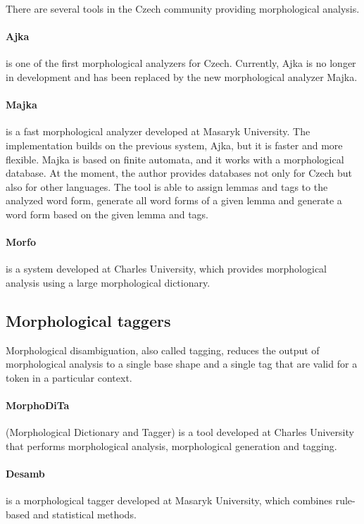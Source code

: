 There are several tools in the Czech community providing morphological analysis.

\paragraph{Ajka}

is one of the first morphological analyzers for Czech. Currently, Ajka is no longer in development and has been replaced by the new morphological analyzer Majka. \cite{Sedlacekthesis}

\paragraph{Majka}

is a fast morphological analyzer developed at Masaryk University. The implementation builds on the previous system, Ajka, but it is faster and more flexible. Majka is based on finite automata, and it works with a morphological database. At the moment, the author provides databases not only for Czech but also for other languages. The tool is able to assign lemmas and tags to the analyzed word form, generate all word forms of a given lemma and generate a word form based on the given lemma and tags. \cite{majka}

\paragraph{Morfo} is a system developed at Charles University, which provides morphological analysis using a large morphological dictionary. \cite{morfo}


\subsection{Morphological taggers}

Morphological disambiguation, also called tagging, reduces the output of morphological analysis to a single base shape and a single tag that are valid for a token in a particular context.

\paragraph{MorphoDiTa} (Morphological Dictionary and Tagger) is a tool developed at Charles University that performs morphological analysis, morphological generation and tagging. \cite{strakova14}

\paragraph{Desamb} is a morphological tagger developed at Masaryk University, which combines rule-based and statistical methods. \cite{desamb2010}


